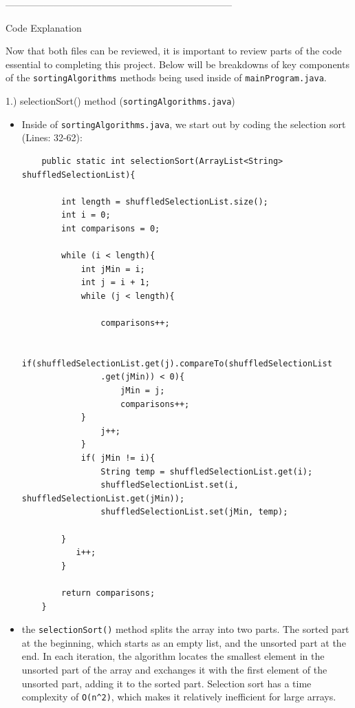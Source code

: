 \documentclass[a4paper,12pt]{article}
\begin{document}
\begin{center}
    -----------------------------------------------------------------------
\end{center}

\begin{center}
\begin{large}
    Code Explanation
\end{large}
\end{center}

Now that both files can be reviewed, it is important to review parts of the code essential to completing this project. Below will be breakdowns of key components of the \verb|sortingAlgorithms| methods being used inside of \verb|mainProgram.java|.

\pagebreak
 
\begin{large}
    1.) selectionSort() method (\verb|sortingAlgorithms.java|)
\end{large}


\begin{itemize}
\item Inside of \verb|sortingAlgorithms.java|, we start out by coding the selection sort (Lines: 32-62):

\begin{verbatim}
    public static int selectionSort(ArrayList<String> shuffledSelectionList){
		
        int length = shuffledSelectionList.size();
        int i = 0;
        int comparisons = 0; 
    
        while (i < length){
            int jMin = i; 
            int j = i + 1; 
            while (j < length){
    				
                comparisons++; 
    
                if(shuffledSelectionList.get(j).compareTo(shuffledSelectionList
                .get(jMin)) < 0){ 
                    jMin = j; 
                    comparisons++; 
            }
    		    j++;
    	    }
    	    if( jMin != i){ 
                String temp = shuffledSelectionList.get(i); 
                shuffledSelectionList.set(i, shuffledSelectionList.get(jMin)); 
                shuffledSelectionList.set(jMin, temp); 
    
        }
    	   i++;
        }

        return comparisons; 
    }
\end{verbatim}
\item the \verb|selectionSort()| method splits the array into two parts. The sorted part at the beginning, which starts as an empty list, and the unsorted part at the end. In each iteration, the algorithm locates the smallest element in the unsorted part of the array and exchanges it with the first element of the unsorted part, adding it to the sorted part. Selection sort has a time complexity of \verb|O(n^2)|, which makes it relatively inefficient for large arrays. \\     

\end{itemize}
\end{document}
